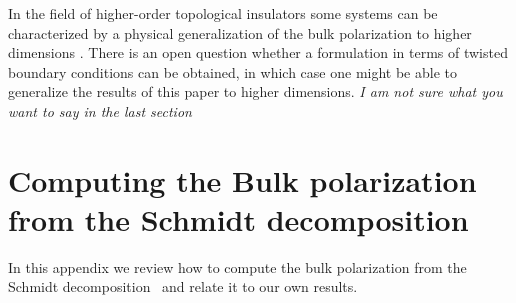 \documentclass[twocolumn,amsmath,longbibliography,amssymb,superscriptaddress]{revtex4-1}
\newcommand{\mariac}[1]{{\it\color{cyan}#1}}
\begin{document}
In the field of higher-order topological insulators some systems can be characterized by a physical generalization of the bulk polarization to higher dimensions \cite{Benalcazar2017,Kang2019}. There is an open question whether a formulation in terms of twisted boundary conditions can be obtained, in which case one might be able to generalize the results of this paper to higher dimensions. \mariac{I am not sure what you want to say in the last section}


	

	
\appendix


\section{Computing the Bulk polarization from the Schmidt decomposition}\label{app:pollmann}

In this appendix we review  how to compute the bulk polarization from the Schmidt decomposition~\cite{Zaletel2014} and relate it to our own results.
\end{document}
